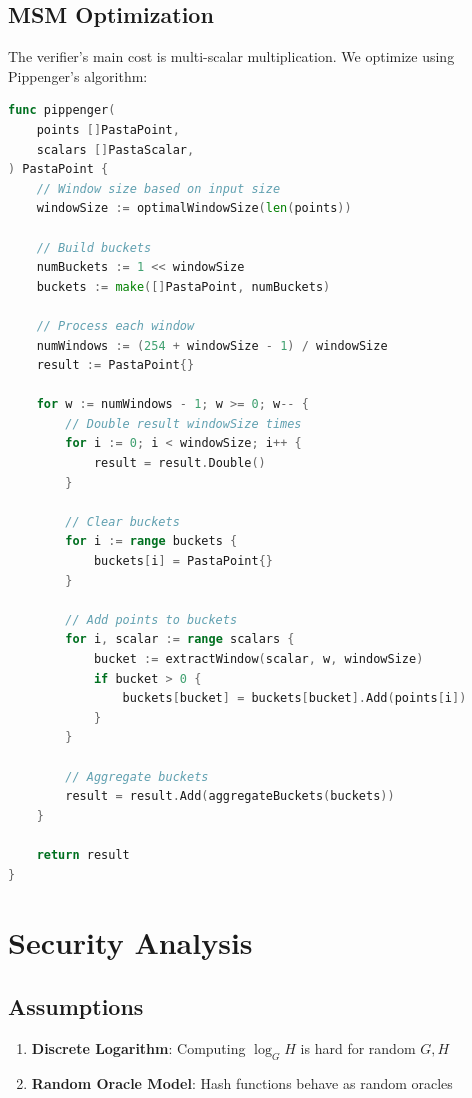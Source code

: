 \documentclass[11pt,a4paper]{article}
\theoremstyle{definition}
\begin{document}
\subsection{MSM Optimization}

The verifier's main cost is multi-scalar multiplication. We optimize using Pippenger's algorithm:

\begin{lstlisting}[language=Go, caption={Optimized MSM}]
func pippenger(
    points []PastaPoint,
    scalars []PastaScalar,
) PastaPoint {
    // Window size based on input size
    windowSize := optimalWindowSize(len(points))

    // Build buckets
    numBuckets := 1 << windowSize
    buckets := make([]PastaPoint, numBuckets)

    // Process each window
    numWindows := (254 + windowSize - 1) / windowSize
    result := PastaPoint{}

    for w := numWindows - 1; w >= 0; w-- {
        // Double result windowSize times
        for i := 0; i < windowSize; i++ {
            result = result.Double()
        }

        // Clear buckets
        for i := range buckets {
            buckets[i] = PastaPoint{}
        }

        // Add points to buckets
        for i, scalar := range scalars {
            bucket := extractWindow(scalar, w, windowSize)
            if bucket > 0 {
                buckets[bucket] = buckets[bucket].Add(points[i])
            }
        }

        // Aggregate buckets
        result = result.Add(aggregateBuckets(buckets))
    }

    return result
}
\end{lstlisting}

\section{Security Analysis}

\subsection{Assumptions}

\begin{enumerate}
    \item \textbf{Discrete Logarithm}: Computing $\log_G H$ is hard for random $G, H$
    \item \textbf{Random Oracle Model}: Hash functions behave as random oracles
\end{enumerate}
\end{document}
